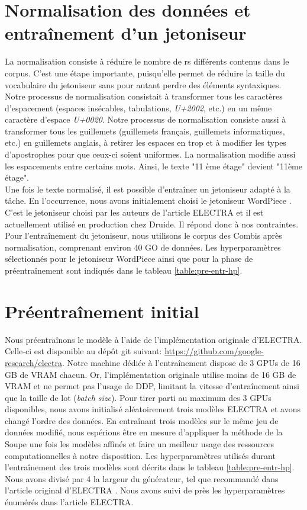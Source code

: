 \documentclass[12pt,twoside,rapport]{dms}
\theoremstyle{definition}
\numberwithin{equation}{section}
\numberwithin{table}{chapter}
\numberwithin{figure}{chapter}
\begin{document}
\section{Normalisation des données et entraînement d'un jetoniseur}
La normalisation consiste à réduire le nombre de rs différents contenus
dans le corpus. C'est une étape importante, puisqu'elle permet de réduire la
taille du vocabulaire du jetoniseur sans pour autant perdre des éléments
syntaxiques. Notre processus de normalisation consistait à transformer tous les
caractères d'espacement (espaces insécables, tabulations, \textit{U+2002},
etc.) en un même caractère d'espace \textit{U+0020}. Notre processus de
normalisation consiste aussi à transformer tous les guillemets (guillemets
français, guillemets informatiques, etc.) en guillemets anglais, à retirer les
espaces en trop et à modifier les types d'apostrophes pour que ceux-ci soient
uniformes. La normalisation modifie aussi les espacements entre certains mots.
Ainsi, le texte "11 ème étage" devient "11ème étage".\\

Une fois le texte normalisé, il est possible d'entraîner un jetoniseur adapté à
la tâche. En l'occurrence, nous avons initialement choisi le jetoniseur
WordPiece \cite{wu2016googlesneuralmachinetranslation}. C'est le jetoniseur
choisi par les auteurs de l'article ELECTRA et il est actuellement utilisé en
production chez Druide. Il répond donc à nos contraintes. Pour l'entraînement
du jetoniseur, nous utilisons le corpus des Combis après normalisation,
comprenant environ 40 GO de données. Les hyperparamètres sélectionnés pour le
jetoniseur WordPiece ainsi que pour la phase de préentraînement sont indiqués
dans le tableau \ref{table:pre-entr-hp}.\\

\section{Préentraînement initial}
Nous préentraînons le modèle à l'aide de l'implémentation originale d'ELECTRA.
Celle-ci est disponible au dépôt git suivant:
\url{https://github.com/google-research/electra}. Notre machine dédiée à
l'entraînement dispose de 3 GPUs de 16 GB de VRAM chacun. Or, l'implémentation
originale utilise moins de 16 GB de VRAM et ne permet pas l'usage de DDP,
limitant la vitesse d'entraînement ainsi que la taille de lot (\textit{batch
	size}). Pour tirer parti au maximum des 3 GPUs disponibles, nous avons
initialisé aléatoirement trois modèles ELECTRA et avons changé l'ordre des
données. En entraînant trois modèles sur le même jeu de données modifié, nous
espérions être en mesure d'appliquer la méthode de la Soupe \cite{soup} une
fois les modèles affinés et faire un meilleur usage des ressources
computationnelles à notre disposition. Les hyperparamètres utilisés durant
l'entraînement des trois modèles sont décrits dans le tableau
\ref{table:pre-entr-hp}. Nous avons divisé par 4 la largeur du générateur, tel
que recommandé dans l'article original d'ELECTRA
\cite{clark2020electrapretrainingtextencoders}. Nous avons suivi de près les
hyperparamètres énumérés dans l'article ELECTRA.
\end{document}
